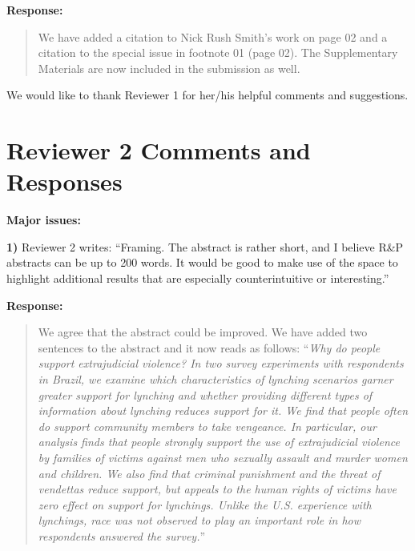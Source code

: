 \documentclass[a4paper,12pt]{article}
\begin{document}
\vspace{.3cm}

\noindent \textbf{Response:} 
\begin{quote}

We have added a citation to Nick Rush Smith's work on page 02 and a citation to
the special issue in footnote 01 (page 02). The Supplementary Materials are now
included in the submission as well.

\end{quote}

\vspace{.3cm}

We would like to thank Reviewer 1 for her/his helpful comments and suggestions.

\section*{Reviewer 2 Comments and Responses}

\textbf{Major issues:}

\noindent \textbf{1)} Reviewer 2 writes: ``Framing. The abstract is rather
short, and I believe R\&P abstracts can be up to 200 words. It would be good to
make use of the space to highlight additional results that are especially
counterintuitive or interesting.''

\vspace{.3cm}

\noindent \textbf{Response:} 
\begin{quote}

We agree that the abstract could be improved. We have added two sentences to
the abstract and it now reads as follows: ``\textit{Why do people support
  extrajudicial violence? In two survey experiments with respondents in Brazil,
  we examine which characteristics of lynching scenarios garner greater support
  for lynching and whether providing different types of information about
  lynching reduces support for it. We find that people often do support
  community members to take vengeance. In particular, our analysis finds that
  people strongly support the use of extrajudicial violence by families of
  victims against men who sexually assault and murder women and children. We
  also find that criminal punishment and the threat of vendettas reduce
  support, but appeals to the human rights of victims have zero effect on
  support for lynchings. Unlike the U.S. experience with lynchings, race was
not observed to play an important role in how respondents answered the
survey.}''

\end{quote}
\end{document}
